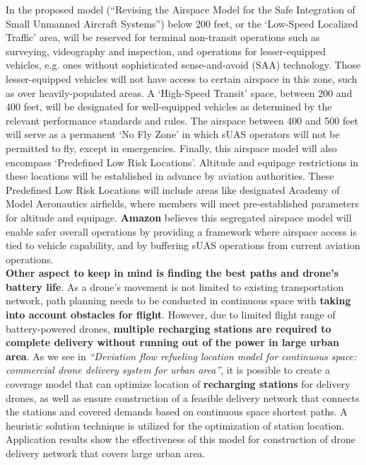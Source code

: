 \documentclass[conference]{IEEEtran}
\begin{document}
In the proposed model (``Revising the Airspace Model for the Safe Integration of Small Unmanned Aircraft Systems'') below 200 feet, or the `Low-Speed Localized Traffic' area, will be reserved for terminal non-transit operations such as surveying, videography and inspection, and operations for lesser-equipped vehicles, e.g. ones without sophisticated sense-and-avoid (SAA) technology. Those lesser-equipped vehicles will not have access to certain airspace in this zone, such as over heavily-populated areas.
A `High-Speed Transit' space, between 200 and 400 feet, will be designated for well-equipped vehicles as determined by the relevant performance standards and rules.
The airspace between 400 and 500 feet will serve as a permanent `No Fly Zone' in which sUAS operators will not be permitted to fly, except in emergencies.
Finally, this airspace model will also encompass `Predefined Low Risk Locations'. Altitude and equipage restrictions in these locations will be established in advance by aviation authorities. These Predefined Low Risk Locations will include areas like designated Academy of Model Aeronautics airfields, where members will meet pre-established parameters for altitude and equipage.
\textbf{Amazon} believes this segregated airspace model will enable safer overall operations by providing a framework where airspace access is tied to vehicle capability, and by buffering sUAS operations from current aviation operations.\\

\textbf{Other aspect to keep in mind is finding the best paths and drone's battery life}. As a drone's movement is not limited to existing transportation network, path planning needs to be conducted in continuous space with \textbf{taking into account obstacles for flight}. However, due to limited flight range of battery-powered drones, \textbf{multiple recharging stations are required to complete delivery without running out of the power in large urban area}. As we see in \textit{``Deviation flow refueling location model for continuous space: commercial drone delivery system for urban area''},  it is possible to create a coverage model that can optimize location of \textbf{recharging stations} for delivery drones, as well as ensure construction of a feasible delivery network that connects the stations and covered demands based on continuous space shortest paths. A heuristic solution technique is utilized for the optimization of station location. Application results show the effectiveness of this model for construction of drone delivery network that covers large urban area.\\
\end{document}
